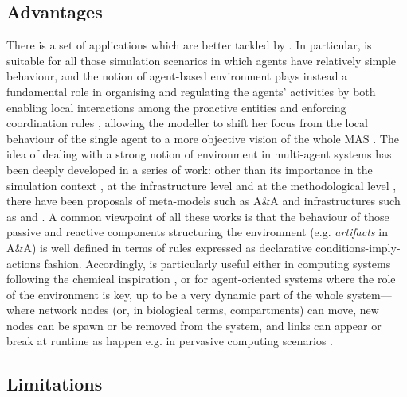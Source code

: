 \documentclass[12pt,a4paper,twoside,openright]{book}
\begin{document}
\subsection{Advantages}

There is a set of applications which are better tackled by \alchemist{}.
%
In particular, \alchemist{} is suitable for all those simulation scenarios in which agents have relatively simple behaviour, and the notion of agent-based environment plays instead a fundamental role in organising and regulating the agents' activities \cite{BandiniE4MAS2006} by both enabling local interactions among the proactive entities \cite{HellebooghAAMAS2007} and enforcing coordination rules \cite{aose-mags5}, allowing the modeller to shift her focus from the local behaviour of the single agent to a more objective vision of the whole MAS \cite{SchumacherCEEMAS2007}. 
%
The idea of dealing with a strong notion of environment in multi-agent systems has been deeply developed in a series of work: other than its importance in the simulation context \cite{HellebooghAAMAS2007}, at the infrastructure level \cite{VHRSZ-JAAMAS2007} and at the methodological level \cite{aose-mags5}, there have been proposals of meta-models such as A\&A \cite{artifacts-jaamas17} and infrastructures such as \tucson{} \cite{tucson-aamas99} and \cartago{} \cite{RPV-JAAMAS2011}.
%
A common viewpoint of all these works is that the behaviour of those passive and reactive components structuring the environment (e.g. \emph{artifacts} in A\&A) is well defined in terms of rules expressed as declarative conditions-imply-actions fashion.
%
Accordingly, \alchemist{} is particularly useful either in computing systems following the chemical inspiration \cite{VCMZ-TAAS2011,VZ-INS2010,sapere-procedia7}, or for agent-oriented systems where the role of the environment is key, up to be a very dynamic part of the whole system---where network nodes (or, in biological terms, compartments) can move, new nodes can be spawn or be removed from the system, and links can appear or break at runtime as happen e.g. in pervasive computing scenarios \cite{sapere-procedia7}.

\subsection{Limitations}
\end{document}
